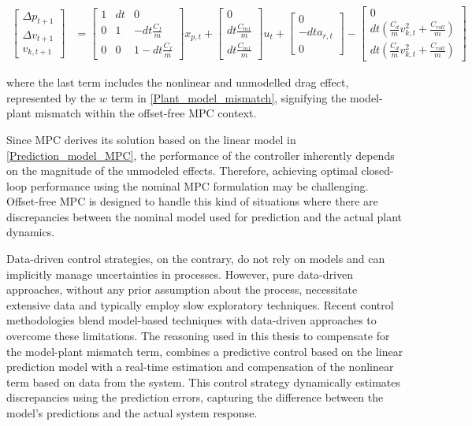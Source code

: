 \documentclass[a4paper,12pt,oneside]{book}
\begin{document}
\begin{equation}
\begin{aligned}
    \begin{bmatrix}
        \Delta p_{t+1}  \\
        \Delta v_{t+1} \\
        v_{k,t+1}
    \end{bmatrix}
    & =
    \begin{bmatrix}
        1 & dt & 0 \\
        0 & 1 & -dt\frac{C_f}{m} \\
        0 & 0 & 1-dt\frac{C_f}{m}
    \end{bmatrix}
    x_{p,t}
    +
    \begin{bmatrix}
        0 \\
        dt \frac{C_{m1}}{m} \\
        dt \frac{C_{m1}}{m}
    \end{bmatrix}
    u_t + 
    \begin{bmatrix}
    0 \\
    - dt a_{r,t} \\
    0
    \end{bmatrix} 
    -
    \begin{bmatrix}
    0 \\
    dt (\frac{C_{d}}{m} v_{k,t}^2+ \frac{C_{roll}}{m}) \\
    dt (\frac{C_{d}}{m} v_{k,t}^2+ \frac{C_{roll}}{m})
    \end{bmatrix}
\end{aligned}
\label{Non-lin_prediction_model_MPC}
\end{equation}

where the last term includes the nonlinear and unmodelled drag effect, represented by the $w$ term in \eqref{Plant_model_mismatch},  signifying the model-plant mismatch within the offset-free MPC context.

\bigskip
Since MPC derives its solution based on the linear model in \eqref{Prediction_model_MPC}, the performance of the controller inherently depends on the magnitude of the unmodeled effects.
Therefore, achieving optimal closed-loop performance using the nominal MPC formulation may be challenging.
Offset-free MPC is designed to handle this kind of situations where there are discrepancies between the nominal model used for prediction and the actual plant dynamics. 

\bigskip
Data-driven control strategies, on the contrary, do not rely on models and can implicitly manage uncertainties in processes. 
However, pure data-driven approaches, without any prior assumption about the process, necessitate extensive data and typically employ slow exploratory techniques.
Recent control methodologies blend model-based techniques with data-driven approaches to overcome these limitations.
The reasoning used in this thesis to compensate for the model-plant mismatch term, combines a predictive control based on the linear prediction model with a real-time estimation and compensation of the nonlinear term based on data from the system.
This control strategy dynamically estimates discrepancies using the prediction errors, capturing the difference between the model's predictions and the actual system response.
\end{document}
